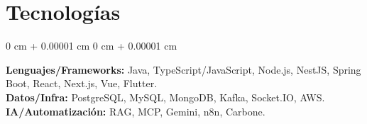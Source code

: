 \documentclass[10pt, letterpaper]{article}
\newenvironment{onecolentry}{
    \begin{adjustwidth}{
        0 cm + 0.00001 cm
    }{
        0 cm + 0.00001 cm
    }
}{
    \end{adjustwidth}
} %
\begin{document}

    



        




\section{Tecnologías}
\begin{onecolentry}
  \textbf{Lenguajes/Frameworks:} Java, TypeScript/JavaScript, Node.js, NestJS, Spring Boot, React, Next.js, Vue, Flutter. \\
  \textbf{Datos/Infra:} PostgreSQL, MySQL, MongoDB, Kafka, Socket.IO, AWS. \\
  \textbf{IA/Automatización:} RAG, MCP, Gemini, n8n, Carbone. \\
\end{onecolentry}

    
\end{document}
